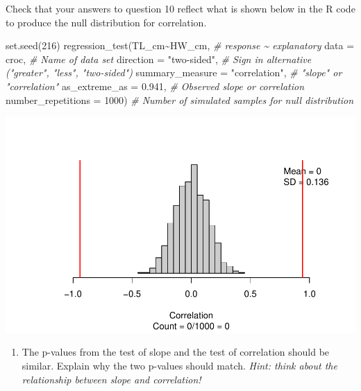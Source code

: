\documentclass[
]{report}
\newenvironment{Shaded}{\begin{snugshade}}{\end{snugshade}}
\newcommand{\AttributeTok}[1]{\textcolor[rgb]{0.77,0.63,0.00}{#1}}
\newcommand{\CommentTok}[1]{\textcolor[rgb]{0.56,0.35,0.01}{\textit{#1}}}
\newcommand{\DecValTok}[1]{\textcolor[rgb]{0.00,0.00,0.81}{#1}}
\newcommand{\FloatTok}[1]{\textcolor[rgb]{0.00,0.00,0.81}{#1}}
\newcommand{\FunctionTok}[1]{\textcolor[rgb]{0.00,0.00,0.00}{#1}}
\newcommand{\NormalTok}[1]{#1}
\newcommand{\SpecialCharTok}[1]{\textcolor[rgb]{0.00,0.00,0.00}{#1}}
\newcommand{\StringTok}[1]{\textcolor[rgb]{0.31,0.60,0.02}{#1}}
\providecommand{\tightlist}{%
  \setlength{\itemsep}{0pt}\setlength{\parskip}{0pt}}
\begin{document}
Check that your answers to question 10 reflect what is shown below in the R code to produce the null distribution for correlation.

\begin{Shaded}
\begin{Highlighting}[]
\FunctionTok{set.seed}\NormalTok{(}\DecValTok{216}\NormalTok{)}
\FunctionTok{regression\_test}\NormalTok{(TL\_cm}\SpecialCharTok{\textasciitilde{}}\NormalTok{HW\_cm, }\CommentTok{\# response \textasciitilde{} explanatory}
               \AttributeTok{data =}\NormalTok{ croc, }\CommentTok{\# Name of data set}
               \AttributeTok{direction =} \StringTok{"two{-}sided"}\NormalTok{, }\CommentTok{\# Sign in alternative ("greater", "less", "two{-}sided")}
               \AttributeTok{summary\_measure =} \StringTok{"correlation"}\NormalTok{, }\CommentTok{\# "slope" or "correlation"}
               \AttributeTok{as\_extreme\_as =} \FloatTok{0.941}\NormalTok{, }\CommentTok{\# Observed slope or correlation}
               \AttributeTok{number\_repetitions =} \DecValTok{1000}\NormalTok{) }\CommentTok{\# Number of simulated samples for null distribution}
\end{Highlighting}
\end{Shaded}

\begin{center}\includegraphics[width=0.7\linewidth]{13-OCA10-regression-simulation_files/figure-latex/unnamed-chunk-6-1} \end{center}

\begin{enumerate}
\def\labelenumi{\arabic{enumi}.}
\setcounter{enumi}{10}
\tightlist
\item
  The p-values from the test of slope and the test of correlation should be similar. Explain why the two p-values should match. \emph{Hint: think about the relationship between slope and correlation!}
  \vspace{1in}
\end{enumerate}
\end{document}

